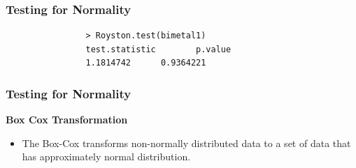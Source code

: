 \documentclass{beamer}
\begin{document}
				\begin{frame}[fragile]
				\frametitle{Testing for Normality}
					\begin{framed}
						\begin{verbatim}
				> Royston.test(bimetal1)
				test.statistic        p.value 
				1.1814742      0.9364221 
				\end{verbatim}
			\end{framed}
			
		\end{frame}
		\begin{frame}[fragile]
			\frametitle{Testing for Normality}
			
			\textbf{Box Cox Transformation}
			\begin{itemize}
				\item The Box-Cox transforms non-normally distributed data to a set of data that has approximately normal distribution. 
			\end{itemize}
		\end{frame}
		
	
\end{document}
